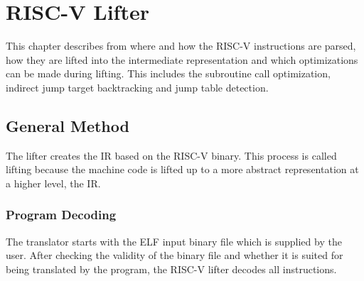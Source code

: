 \documentclass[course=eragp]{aspdoc}
\begin{document}
\section{RISC-V Lifter}\label{sec:riscv_lifter}

This chapter describes from where and how the RISC-V instructions are parsed, how they are lifted
into the intermediate representation and which optimizations can be made during lifting. This
includes the subroutine call optimization, indirect jump target backtracking and jump table detection.

\subsection{General Method}



The lifter creates the IR based on the RISC-V binary. This process is called lifting because the
machine code is lifted up to a more abstract representation at a higher level, the IR.

\subsubsection{Program Decoding}\label{sec:program_decoding}

The translator starts with the ELF input binary file which is supplied by the user. After checking the
validity of the binary file and whether it is suited for being translated by the program, the
RISC-V lifter decodes all instructions.

\par
\end{document}

